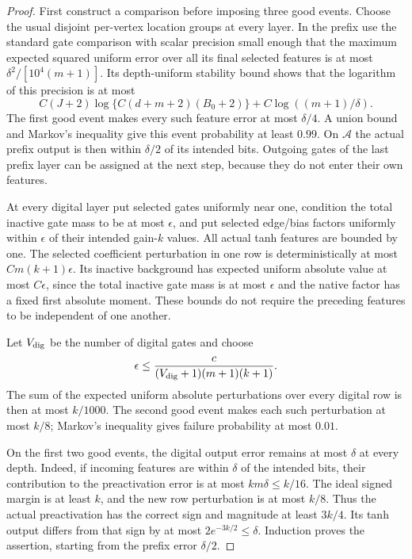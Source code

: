 \begin{proof}
First construct a comparison before imposing three good events.
Choose the usual disjoint per-vertex location groups at every layer.
In the prefix use the standard gate comparison with scalar precision
small enough that the maximum expected squared uniform error over
all its final selected features is at most
$\delta^2/[10^4(m+1)]$. Its depth-uniform stability bound shows that
the logarithm of this precision is at most
\[
 C(J+2)\log\{C(d+m+2)(B_0+2)\}
       +C\log((m+1)/\delta).
\]
The first good event makes every such feature error at most
$\delta/4$. A union bound and Markov's inequality give this event
probability at least $0.99$. On $\mathcal A$ the actual prefix output
is then within $\delta/2$ of its intended bits. Outgoing gates of
the last prefix layer can be assigned at the next step, because they
do not enter their own features.

At every digital layer put selected gates uniformly near one,
condition the total inactive gate mass to be at most $\epsilon$,
and put selected edge/bias factors uniformly within $\epsilon$ of
their intended gain-$k$ values. All actual tanh features are bounded
by one. The selected coefficient perturbation in one row is
deterministically at most $C m(k+1)\epsilon$. Its inactive background
has expected uniform absolute value at most $C\epsilon$, since the
total inactive gate mass is at most $\epsilon$ and the native factor
has a fixed first absolute moment. These bounds do not require the
preceding features to be independent of one another.

Let $V_{\rm dig}$ be the number of digital gates and choose
\[
 \epsilon\le
 \frac{c}{(V_{\rm dig}+1)(m+1)(k+1)}.
\]
The sum of the expected uniform absolute perturbations over every
digital row is then at most $k/1000$. The second good event makes
each such perturbation at most $k/8$; Markov's inequality gives
failure probability at most $0.01$.

On the first two good events, the digital output error remains
at most $\delta$ at every depth. Indeed, if incoming features are
within $\delta$ of the intended bits, their contribution to the
preactivation error is at most $km\delta\le k/16$.
The ideal signed margin is at least $k$, and the new row perturbation
is at most $k/8$. Thus the actual preactivation has the correct sign
and magnitude at least $3k/4$. Its tanh output differs from that sign
by at most $2e^{-3k/2}\le\delta$. Induction proves the assertion,
starting from the prefix error $\delta/2$.


\end{proof}
